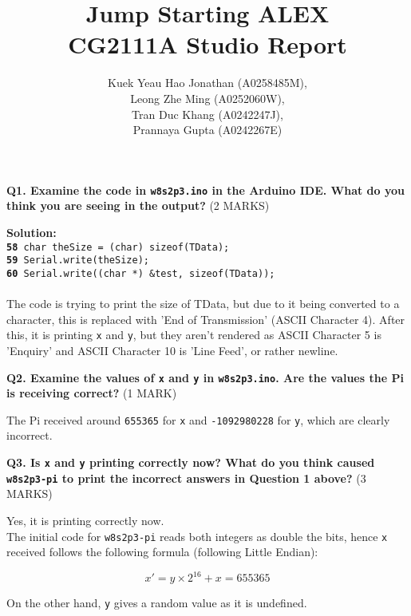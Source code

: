\documentclass[a4paper,12pt,oneside, tikz]{book}
\title{\Huge\textbf{Jump Starting ALEX} \\ \Large{CG2111A Studio Report}}
\author{
Kuek Yeau Hao Jonathan (A0258485M), \\
Leong Zhe Ming (A0252060W), \\
Tran Duc Khang (A0242247J), \\ 
Prannaya Gupta (A0242267E)
}
\begin{document}
\maketitle

\newpage

\textbf{Q1. Examine the code in \texttt{w8s2p3.ino} in the Arduino IDE. What do you think you are seeing in the output?} (2 MARKS)

\begin{tcolorbox}
\textbf{Solution:}\\
\texttt{\textbf{58}    char theSize = (char) sizeof(TData); \\
\textbf{59}    Serial.write(theSize); \\
\textbf{60}    Serial.write((char *) &test, sizeof(TData));} \\

\\

The code is trying to print the size of TData, but due to it being converted to a character, this is replaced with 'End of Transmission' (ASCII Character 4). After this, it is printing \texttt{x} and \texttt{y}, but they aren't rendered as ASCII Character 5 is 'Enquiry' and ASCII Character 10 is 'Line Feed', or rather newline.
\end{tcolorbox}

\textbf{Q2. Examine the values of \texttt{x} and \texttt{y} in \texttt{w8s2p3.ino}. Are the values the Pi is receiving correct?} (1 MARK)

\begin{tcolorbox}
The Pi received around \texttt{655365} for \texttt{x} and \texttt{-1092980228} for \texttt{y}, which are clearly incorrect.
\end{tcolorbox}

\textbf{Q3. Is \texttt{x} and \texttt{y} printing correctly now? What do you think caused \texttt{w8s2p3-pi} to print the incorrect answers in Question 1 above?} (3 MARKS)

\begin{tcolorbox}
Yes, it is printing correctly now. \\

The initial code for \texttt{w8s2p3-pi} reads both integers as double the bits, hence \texttt{x} received follows the following formula (following Little Endian):

$$x' = y \times 2^{16} + x = 655365$$

On the other hand, \texttt{y} gives a random value as it is undefined.
\end{tcolorbox}
\end{document}
